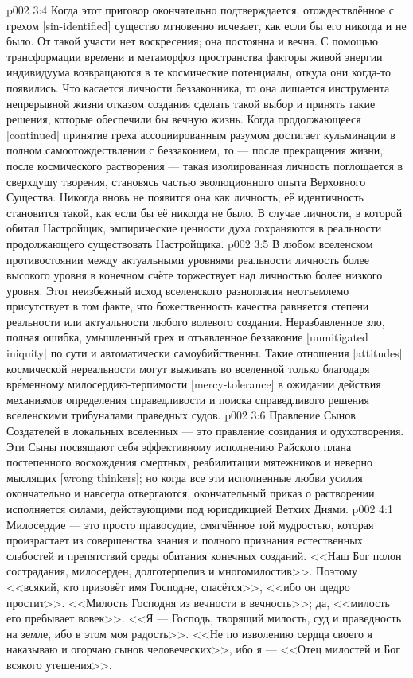 \vs p002 3:4 Когда этот приговор окончательно подтверждается, отождествлённое с грехом [sin\hyp{}identified] существо мгновенно исчезает, как если бы его никогда и не было. От такой участи нет воскресения; она постоянна и вечна. С помощью трансформации времени и метаморфоз пространства факторы живой энергии индивидуума возвращаются в те космические потенциалы, откуда они когда\hyp{}то появились. Что касается личности беззаконника, то она лишается инструмента непрерывной жизни отказом создания сделать такой выбор и принять такие решения, которые обеспечили бы вечную жизнь. Когда продолжающееся [continued] принятие греха ассоциированным разумом достигает кульминации в полном самоотождествлении с беззаконием, то --- после прекращения жизни, после космического растворения --- такая изолированная личность поглощается в сверхдушу творения, становясь частью эволюционного опыта Верховного Существа. Никогда вновь не появится она как личность; её идентичность становится такой, как если бы её никогда не было. В случае личности, в которой обитал Настройщик, эмпирические ценности духа сохраняются в реальности продолжающего существовать Настройщика.
\vs p002 3:5 \pc В любом вселенском противостоянии между актуальными уровнями реальности личность более высокого уровня в конечном счёте торжествует над личностью более низкого уровня. Этот неизбежный исход вселенского разногласия неотъемлемо присутствует в том факте, что божественность качества равняется степени реальности или актуальности любого волевого создания. Неразбавленное зло, полная ошибка, умышленный грех и отъявленное беззаконие [unmitigated iniquity] по сути и автоматически самоубийственны. Такие отношения [attitudes] космической нереальности могут выживать во вселенной только благодаря вр\'еменному милосердию\hyp{}терпимости [mercy\hyp{}tolerance] в ожидании действия механизмов определения справедливости и поиска справедливого решения вселенскими трибуналами праведных судов.
\vs p002 3:6 Правление Сынов Создателей в локальных вселенных --- это правление созидания и одухотворения. Эти Сыны посвящают себя эффективному исполнению Райского плана постепенного восхождения смертных, реабилитации мятежников и неверно мыслящих [wrong thinkers]; но когда все эти исполненные любви усилия окончательно и навсегда отвергаются, окончательный приказ о растворении исполняется силами, действующими под юрисдикцией Ветхих Днями.
\vs p002 4:1 Милосердие --- это просто правосудие, смягчённое той мудростью, которая произрастает из совершенства знания и полного признания естественных слабостей и препятствий среды обитания конечных созданий. <<Наш Бог полон сострадания, милосерден, долготерпелив и многомилостив>>. Поэтому <<всякий, кто призовёт имя Господне, спасётся>>, <<ибо он щедро простит>>. <<Милость Господня из вечности в вечность>>; да, <<милость его пребывает вовек>>. <<Я --- Господь, творящий милость, суд и праведность на земле, ибо в этом моя радость>>. <<Не по изволению сердца своего я наказываю и огорчаю сынов человеческих>>, ибо я --- <<Отец милостей и Бог всякого утешения>>.
